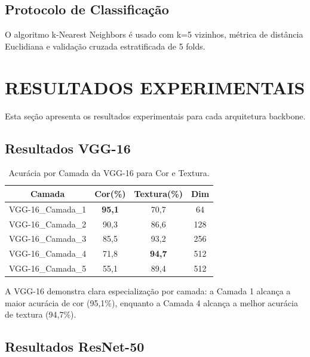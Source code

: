 \documentclass[conference]{IEEEtran}
\begin{document}
\subsection{Protocolo de Classificação}
O algoritmo k-Nearest Neighbors é usado com k=5 vizinhos, métrica de distância Euclidiana e validação cruzada estratificada de 5 folds.


\section{RESULTADOS EXPERIMENTAIS}

Esta seção apresenta os resultados experimentais para cada arquitetura backbone.

\subsection{Resultados VGG-16}

\begin{table}[htbp]
\caption{Acurácia por Camada da VGG-16 para Cor e Textura.}
\begin{center}
\begin{tabular}{|c|c|c|c|}
\hline
\textbf{Camada} & \textbf{Cor(\%)} & \textbf{Textura(\%)} & \textbf{Dim}\\
\hline
VGG-16\_Camada\_1 & \textbf{95,1} & 70,7 & 64 \\
\hline
VGG-16\_Camada\_2 & 90,3 & 86,6 & 128 \\
\hline
VGG-16\_Camada\_3 & 85,5 & 93,2 & 256 \\
\hline
VGG-16\_Camada\_4 & 71,8 & \textbf{94,7} & 512 \\
\hline
VGG-16\_Camada\_5 & 55,1 & 89,4 & 512 \\
\hline
\end{tabular}
\label{tab1}
\end{center}
\end{table}

A VGG-16 demonstra clara especialização por camada: a Camada 1 alcança a maior acurácia de cor (95,1\%), enquanto a Camada 4 alcança a melhor acurácia de textura (94,7\%).

\subsection{Resultados ResNet-50}
\end{document}
